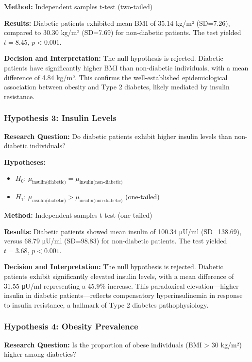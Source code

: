 \documentclass[12pt]{article}
\begin{document}
\textbf{Method:} Independent samples t-test (two-tailed)

\textbf{Results:} Diabetic patients exhibited mean BMI of 35.14 kg/m² (SD=7.26), compared to 30.30 kg/m² (SD=7.69) for non-diabetic patients. The test yielded $t = 8.45$, $p < 0.001$.

\textbf{Decision and Interpretation:} The null hypothesis is rejected. Diabetic patients have significantly higher BMI than non-diabetic individuals, with a mean difference of 4.84 kg/m². This confirms the well-established epidemiological association between obesity and Type 2 diabetes, likely mediated by insulin resistance.

\subsubsection{Hypothesis 3: Insulin Levels}

\textbf{Research Question:} Do diabetic patients exhibit higher insulin levels than non-diabetic individuals?

\textbf{Hypotheses:}
\begin{itemize}
    \item $H_0$: $\mu_{\text{insulin(diabetic)}} = \mu_{\text{insulin(non-diabetic)}}$
    \item $H_1$: $\mu_{\text{insulin(diabetic)}} > \mu_{\text{insulin(non-diabetic)}}$ (one-tailed)
\end{itemize}

\textbf{Method:} Independent samples t-test (one-tailed)

\textbf{Results:} Diabetic patients showed mean insulin of 100.34 μU/ml (SD=138.69), versus 68.79 μU/ml (SD=98.83) for non-diabetic patients. The test yielded $t = 3.68$, $p < 0.001$.

\textbf{Decision and Interpretation:} The null hypothesis is rejected. Diabetic patients exhibit significantly elevated insulin levels, with a mean difference of 31.55 μU/ml representing a 45.9\% increase. This paradoxical elevation—higher insulin in diabetic patients—reflects compensatory hyperinsulinemia in response to insulin resistance, a hallmark of Type 2 diabetes pathophysiology.

\subsubsection{Hypothesis 4: Obesity Prevalence}

\textbf{Research Question:} Is the proportion of obese individuals (BMI > 30 kg/m²) higher among diabetics?
\end{document}
